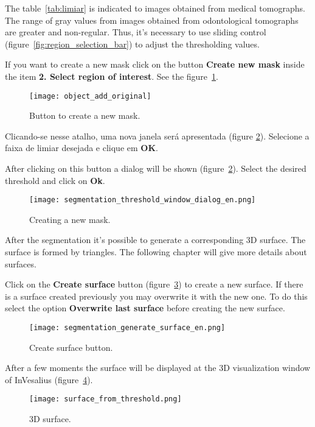 The table~\ref{tab:limiar} is indicated to images obtained from medical tomographs. The range of gray values from images obtained from odontological tomographs are greater and non-regular. Thus, it's necessary to use sliding control (figure~\ref{fig:region_selection_bar}) to adjust the thresholding values.

If you want to create a new mask click on the button \textbf{Create new mask} inside the item  \textbf{2. Select region of interest}. See the figure~\ref{fig:shortcut_new_mask}.

\begin{figure}[!htb]
\centering
\texttt{[image: object\_add\_original]}
\caption{Button to create a new mask.}
\label{fig:shortcut_new_mask}
\end{figure}

Clicando-se nesse atalho, uma nova janela será apresentada (figure \ref{fig:create_new_mask}).  Selecione a faixa de limiar desejada e clique em \textbf{OK}.

After clicking on this button a dialog will be shown (figure~\ref{fig:create_new_mask}). Select the desired threshold and click on \textbf{Ok}.

\begin{figure}[!htb]
\centering
\texttt{[image: segmentation\_threshold\_window\_dialog\_en.png]}
\caption{Creating a new mask.}
\label{fig:create_new_mask}
\end{figure}

\newpage

After the segmentation it's possible to generate a corresponding 3D surface. The surface is formed by triangles. The following chapter will give more details about surfaces.

Click on the \textbf{Create surface} button (figure~\ref{fig:generate_surface}) to create a new surface. If there is a surface created previously you may overwrite it with the new one. To do this select the option \textbf{Overwrite last surface} before creating the new surface.

\begin{figure}[!htb]
\centering
\texttt{[image: segmentation\_generate\_surface\_en.png]}
\caption{Create surface button.}
\label{fig:generate_surface}
\end{figure}

After a few moments the surface will be displayed at the 3D visualization window of InVesalius (figure~\ref{fig:surface}).

\begin{figure}[!htb]
\centering
\texttt{[image: surface\_from\_threshold.png]}
\caption{3D surface.}
\label{fig:surface}
\end{figure}



